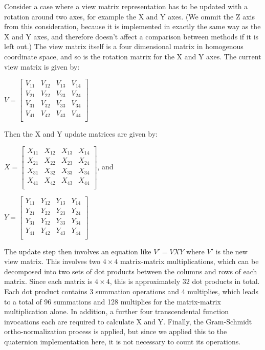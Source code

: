 \documentclass{acm_proc_article-sp}
\begin{document}
Consider a case where a view matrix representation has to be updated with a rotation around two axes, for example the X and Y axes.
(We ommit the Z axis from this consideration, because it is implemented in exactly the same way as the X and Y axes, and therefore doesn't affect a comparison between methods if it is left out.)
The view matrix itself is a four dimensional matrix in homogenous coordinate space, and so is the rotation matrix for the X and Y axes.
The current view matrix is given by:

$V = \left[ \begin{array}{cccc}
    V_{11} & V_{12} & V_{13} & V_{14} \\
    V_{21} & V_{22} & V_{23} & V_{24} \\
    V_{31} & V_{32} & V_{33} & V_{34} \\
    V_{41} & V_{42} & V_{43} & V_{44} \\
\end{array} \right]$

Then the X and Y update matrices are given by:

\vspace{0.5em}
$X = \left[ \begin{array}{cccc}
    X_{11} & X_{12} & X_{13} & X_{14} \\
    X_{21} & X_{22} & X_{23} & X_{24} \\
    X_{31} & X_{32} & X_{33} & X_{34} \\
    X_{41} & X_{42} & X_{43} & X_{44} \\
\end{array} \right]$, and

$Y = \left[ \begin{array}{cccc}
    Y_{11} & Y_{12} & Y_{13} & Y_{14} \\
    Y_{21} & Y_{22} & Y_{23} & Y_{24} \\
    Y_{31} & Y_{32} & Y_{33} & Y_{34} \\
    Y_{41} & Y_{42} & Y_{43} & Y_{44} \\
\end{array} \right]$

The update step then involves an equation like $V\prime = VXY$ where $V\prime$ is the new view matrix.
This involves two $4 \times 4$ matrix-matrix multiplications, which can be decomposed into two sets of dot products between the columns and rows of each matrix.
Since each matrix is $4 \times 4$, this is approximately 32 dot products in total.
Each dot product contains 3 summation operations and 4 multiplies, which leads to a total of 96 summations and 128 multiplies for the matrix-matrix multiplication alone.
In addition, a further four transcendental function invocations each are required to calculate X and Y.
Finally, the Gram-Schmidt ortho-normalization process is applied, but since we applied this to the quaternion implementation here, it is not necessary to count its operations.
\end{document}
